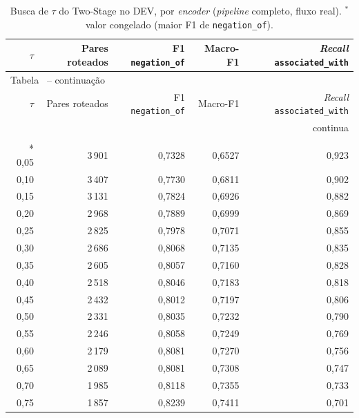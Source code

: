 \begingroup\small\renewcommand{\arraystretch}{1.2}\setlength{\tabcolsep}{4pt}
\setlength{\LTleft}{0pt}\setlength{\LTright}{0pt}\setlength{\LTcapwidth}{\textwidth}
\Needspace*{0.3\textheight}
\begin{longtable}{@{\extracolsep{\fill}}rrrrr}
\caption{Busca de $\tau$ do Two-Stage no DEV, por \emph{encoder} (\emph{pipeline} completo, fluxo real). $^{\ast}$ valor congelado (maior F1 de \texttt{negation\_of}).}\label{tab:tau_encoders} \\
\toprule
$\tau$ & Pares roteados & F1 \texttt{negation\_of} & Macro-F1 & \emph{Recall} \texttt{associated\_with} \\
\midrule
\endfirsthead
\multicolumn{5}{l}{\footnotesize Tabela~\thetable{} -- continuação} \\
\toprule
$\tau$ & Pares roteados & F1 \texttt{negation\_of} & Macro-F1 & \emph{Recall} \texttt{associated\_with} \\
\midrule
\endhead
\midrule
\multicolumn{5}{r}{\footnotesize continua} \\
\endfoot
\bottomrule
\endlastfoot
\multicolumn{5}{l}{\textbf{BioBERTpt-all} (valor congelado: $\tau=0{,}95$)} \\*
0{,}05 & 3\,901 & 0{,}7328 & 0{,}6527 & 0{,}923 \\
0{,}10 & 3\,407 & 0{,}7730 & 0{,}6811 & 0{,}902 \\
0{,}15 & 3\,131 & 0{,}7824 & 0{,}6926 & 0{,}882 \\
0{,}20 & 2\,968 & 0{,}7889 & 0{,}6999 & 0{,}869 \\
0{,}25 & 2\,825 & 0{,}7978 & 0{,}7071 & 0{,}855 \\
0{,}30 & 2\,686 & 0{,}8068 & 0{,}7135 & 0{,}835 \\
0{,}35 & 2\,605 & 0{,}8057 & 0{,}7160 & 0{,}828 \\
0{,}40 & 2\,518 & 0{,}8046 & 0{,}7183 & 0{,}818 \\
0{,}45 & 2\,432 & 0{,}8012 & 0{,}7197 & 0{,}806 \\
0{,}50 & 2\,331 & 0{,}8035 & 0{,}7232 & 0{,}790 \\
0{,}55 & 2\,246 & 0{,}8058 & 0{,}7249 & 0{,}769 \\
0{,}60 & 2\,179 & 0{,}8081 & 0{,}7270 & 0{,}756 \\
0{,}65 & 2\,089 & 0{,}8081 & 0{,}7308 & 0{,}747 \\
0{,}70 & 1\,985 & 0{,}8118 & 0{,}7355 & 0{,}733 \\
0{,}75 & 1\,857 & 0{,}8239 & 0{,}7411 & 0{,}701 \\

\end{longtable}
